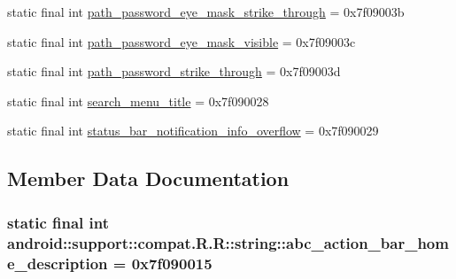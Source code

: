 \begin{CompactItemize}
\item 
static final int \hyperlink{classandroid_1_1support_1_1compat_1_1_r_1_1string_60faa29a38daa0a62446086b48559286}{path\_\-password\_\-eye\_\-mask\_\-strike\_\-through} = 0x7f09003b
\item 
static final int \hyperlink{classandroid_1_1support_1_1compat_1_1_r_1_1string_baabbba78313a7878cf56541971f185d}{path\_\-password\_\-eye\_\-mask\_\-visible} = 0x7f09003c
\item 
static final int \hyperlink{classandroid_1_1support_1_1compat_1_1_r_1_1string_a82ba7bee4b9729b4afa03dd6de551ea}{path\_\-password\_\-strike\_\-through} = 0x7f09003d
\item 
static final int \hyperlink{classandroid_1_1support_1_1compat_1_1_r_1_1string_af9309eb262cb3e960d5e49228ee21f9}{search\_\-menu\_\-title} = 0x7f090028
\item 
static final int \hyperlink{classandroid_1_1support_1_1compat_1_1_r_1_1string_44d1029ee54d53ea65b5529ea4eff1a9}{status\_\-bar\_\-notification\_\-info\_\-overflow} = 0x7f090029
\end{CompactItemize}


\subsection{Member Data Documentation}
\hypertarget{classandroid_1_1support_1_1compat_1_1_r_1_1string_f5b578bd12acfd3ed568232a63bca9ca}{
\subsubsection[{abc\_\-action\_\-bar\_\-home\_\-description}]{\setlength{\rightskip}{0pt plus 5cm}static final int android::support::compat.R.R::string::abc\_\-action\_\-bar\_\-home\_\-description = 0x7f090015}}
\label{classandroid_1_1support_1_1compat_1_1_r_1_1string_f5b578bd12acfd3ed568232a63bca9ca}


